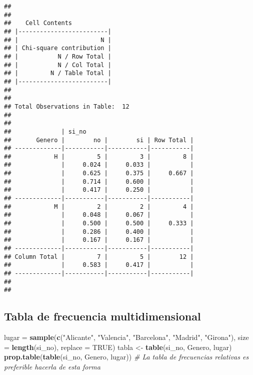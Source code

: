 \documentclass[]{article}
\newenvironment{Shaded}{\begin{snugshade}}{\end{snugshade}}
\newcommand{\CommentTok}[1]{\textcolor[rgb]{0.56,0.35,0.01}{\textit{#1}}}
\newcommand{\DataTypeTok}[1]{\textcolor[rgb]{0.13,0.29,0.53}{#1}}
\newcommand{\KeywordTok}[1]{\textcolor[rgb]{0.13,0.29,0.53}{\textbf{#1}}}
\newcommand{\NormalTok}[1]{#1}
\newcommand{\OtherTok}[1]{\textcolor[rgb]{0.56,0.35,0.01}{#1}}
\newcommand{\StringTok}[1]{\textcolor[rgb]{0.31,0.60,0.02}{#1}}
\begin{document}
\begin{verbatim}
## 
##  
##    Cell Contents
## |-------------------------|
## |                       N |
## | Chi-square contribution |
## |           N / Row Total |
## |           N / Col Total |
## |         N / Table Total |
## |-------------------------|
## 
##  
## Total Observations in Table:  12 
## 
##  
##              | si_no 
##       Genero |        no |        si | Row Total | 
## -------------|-----------|-----------|-----------|
##            H |         5 |         3 |         8 | 
##              |     0.024 |     0.033 |           | 
##              |     0.625 |     0.375 |     0.667 | 
##              |     0.714 |     0.600 |           | 
##              |     0.417 |     0.250 |           | 
## -------------|-----------|-----------|-----------|
##            M |         2 |         2 |         4 | 
##              |     0.048 |     0.067 |           | 
##              |     0.500 |     0.500 |     0.333 | 
##              |     0.286 |     0.400 |           | 
##              |     0.167 |     0.167 |           | 
## -------------|-----------|-----------|-----------|
## Column Total |         7 |         5 |        12 | 
##              |     0.583 |     0.417 |           | 
## -------------|-----------|-----------|-----------|
## 
## 
\end{verbatim}

\hypertarget{tabla-de-frecuencia-multidimensional}{%
\subsection{Tabla de frecuencia
multidimensional}\label{tabla-de-frecuencia-multidimensional}}

\begin{Shaded}
\begin{Highlighting}[]
\NormalTok{lugar =}\StringTok{ }\KeywordTok{sample}\NormalTok{(}\KeywordTok{c}\NormalTok{(}\StringTok{"Alicante"}\NormalTok{, }\StringTok{"Valencia"}\NormalTok{, }\StringTok{"Barcelona"}\NormalTok{, }\StringTok{"Madrid"}\NormalTok{, }\StringTok{"Girona"}\NormalTok{), }\DataTypeTok{size =} \KeywordTok{length}\NormalTok{(si_no), }\DataTypeTok{replace =} \OtherTok{TRUE}\NormalTok{)}
\NormalTok{tabla <-}\StringTok{ }\KeywordTok{table}\NormalTok{(si_no, Genero, lugar)}
\KeywordTok{prop.table}\NormalTok{(}\KeywordTok{table}\NormalTok{(si_no, Genero, lugar)) }\CommentTok{# La tabla de frecuencias relativas es preferible hacerla de esta forma}
\end{Highlighting}
\end{Shaded}
\end{document}
